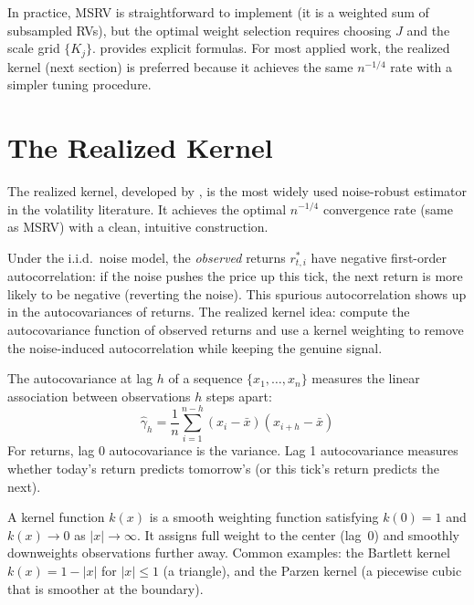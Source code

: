 In practice, MSRV is straightforward to implement (it is a weighted sum of subsampled RVs), but the optimal weight selection requires choosing $J$ and the scale grid $\{K_j\}$.
\citet{Zhang2006} provides explicit formulas.
For most applied work, the realized kernel (next section) is preferred because it achieves the same $n^{-1/4}$ rate with a simpler tuning procedure.


\section{The Realized Kernel}
\label{sec:realized-kernel}

The realized kernel, developed by \citet{BNHLS2008}, is the most widely used noise-robust estimator in the volatility literature.
It achieves the optimal $n^{-1/4}$ convergence rate (same as MSRV) with a clean, intuitive construction.

\begin{intuition}
Under the i.i.d.\ noise model, the \emph{observed} returns $r^*_{t,i}$ have negative first-order autocorrelation: if the noise pushes the price up this tick, the next return is more likely to be negative (reverting the noise).
This spurious autocorrelation shows up in the autocovariances of returns.
The realized kernel idea: compute the autocovariance function of observed returns and use a kernel weighting to remove the noise-induced autocorrelation while keeping the genuine signal.
\end{intuition}

\begin{prereq}[Autocovariance]
The autocovariance at lag $h$ of a sequence $\{x_1, \ldots, x_n\}$ measures the linear association between observations $h$ steps apart:
\[
  \hat{\gamma}_h = \frac{1}{n} \sum_{i=1}^{n-h} (x_i - \bar{x})(x_{i+h} - \bar{x})
\]
For returns, lag 0 autocovariance is the variance.
Lag 1 autocovariance measures whether today's return predicts tomorrow's (or this tick's return predicts the next).
\end{prereq}

\begin{prereq}
A kernel function $k(x)$ is a smooth weighting function satisfying $k(0) = 1$ and $k(x) \to 0$ as $|x| \to \infty$.
It assigns full weight to the center (lag~0) and smoothly downweights observations further away.
Common examples: the Bartlett kernel $k(x) = 1 - |x|$ for $|x| \leq 1$ (a triangle), and the Parzen kernel (a piecewise cubic that is smoother at the boundary).
\end{prereq}

